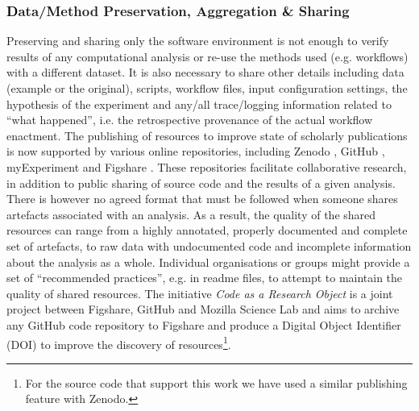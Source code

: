 \documentclass[a4paper,num-refs]{oup-contemporary}
\begin{document}
\subsubsection{\textcolor{black} Data/Method Preservation, Aggregation \& Sharing}
Preserving and sharing only the software environment is not enough to verify results of any computational analysis or re-use the methods used (e.g. workflows) with a different dataset. It is also necessary to share other details including data (example or the original), scripts, workflow files, input configuration settings, the hypothesis of the experiment and any/all trace/logging information related to ``what happened'', i.e. the retrospective provenance of the actual workflow enactment. The publishing of resources to improve state of scholarly publications is now supported by various online repositories, including Zenodo \citep{Zenodo}, GitHub \citep{GitHub}, myExperiment \citep{Goble2010} and Figshare \citep{figshare}. These repositories facilitate collaborative research, in addition to public sharing of source code and the results of a given analysis. There is however no agreed format that must be followed when someone shares artefacts associated with an analysis. As a result, the quality of the shared resources can range from a highly annotated, properly documented and complete set of artefacts, to raw data with undocumented code and incomplete information about the analysis as a whole. Individual organisations or groups might provide a set of ``recommended practices'', e.g. in readme files, to attempt to maintain the quality of shared resources. The initiative \textit{Code as a Research Object} \citep{CodeasaR} is a joint project between Figshare, GitHub and Mozilla Science Lab \citep{Mozilla} and aims to archive any GitHub code repository to Figshare and produce a Digital Object Identifier (DOI) to improve the discovery of resources\footnote{For the source code that support this work we have used a similar publishing feature with Zenodo.}.
\end{document}
